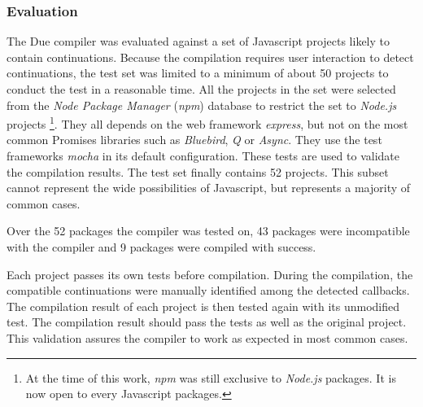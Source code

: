 \subsubsection{Evaluation} \label{chapter5:due:evaluation}




The Due compiler was evaluated against a set of Javascript projects likely to contain continuations.
Because the compilation requires user interaction to detect continuations, the test set was limited to a minimum of about \num{50} projects to conduct the test in a reasonable time.
All the projects in the set were selected from the \textit{Node Package Manager} (\textit{npm})  database to restrict the set to \textit{Node.js} projects \footnote{At the time of this work, \textit{npm} was still exclusive to \textit{Node.js} packages. It is now open to every Javascript packages.}.
They all depends on the web framework \textit{express}, but not on the most common Promises libraries such as \textit{Bluebird}, \textit{Q} or \textit{Async}.
They use the test frameworks \textit{mocha} in its default configuration.
These tests are used to validate the compilation results.
The test set finally contains \num{52} projects.
This subset cannot represent the wide possibilities of Javascript, but represents a majority of common cases.

Over the \num{52} packages the compiler was tested on, 43 packages were incompatible with the compiler and 9 packages were compiled with success.


Each project passes its own tests before compilation.
During the compilation, the compatible continuations were manually identified among the detected callbacks.
The compilation result of each project is then tested again with its unmodified test.
The compilation result should pass the tests as well as the original project.
This validation assures the compiler to work as expected in most common cases.

